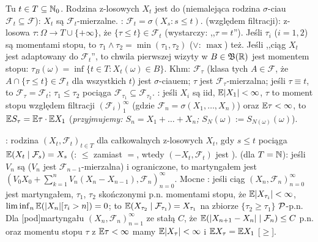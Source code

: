 Tu $t \in T \subseteq \mathbb N_0$.
Rodzina  z-losowych $X_t$ jest  do  (niemalejąca rodzina $\sigma$-ciau $\mathcal F_t \subseteq \mathcal F$): $X_t$ są $\mathcal F_t$-mierzalne.
: $\mathcal F_t = \sigma (X_s : s \le t)$.
 (względem filtracji): z-losowa $\tau \colon \Omega \to T \cup \{+\infty\}$, że $\{\tau \le t\} \in \mathcal F_t$ (wystarczy: ,,$\tau = t$'').
Jeśli $\tau_i$ ($i = 1,2$) są momentami stopu, to $\tau_1 \wedge \tau_2 = \min (\tau_1, \tau_2)$ ($\vee$: $\max$) też.
Jeśli ,,ciąg $X_t$ jest adaptowany do $\mathcal F_t$'', to chwila pierwszej wizyty w $B \in \mathfrak B(\mathbb{R})$ jest momentem stopu: $\tau_B (\omega) = \inf \{t \in T : X_t (\omega) \in B\}$.
Khm: $\mathcal F_\tau$ (klasa tych $A \in \mathcal F$, że $A \cap \{\tau \le t\} \in \mathcal F_t$ dla wszystkich $t$) jest $\sigma$-ciauem; $\tau$ jest $\mathcal F_\tau$-mierzalna; jeśli $\tau \equiv t$, to $\mathcal F_\tau = \mathcal F_t$; $\tau_1 \le \tau_2$ pociąga $\mathcal F_{\tau_1} \subseteq \mathcal F_{\tau_2}$.
: jeśli $X_i$ są iid, $\mathbb{E} |X_1| < \infty$, $\tau$ to moment stopu względem filtracji $(\mathcal F_i)_1^\infty$ (gdzie $\mathcal F_n = \sigma (X_1, \ldots, X_n)$) oraz $\mathbb{E} \tau < \infty$, to $\mathbb{E} S_\tau = \mathbb{E} \tau \cdot \mathbb{E} X_1$ (\emph{przyjmujemy: $S_n = X_1 + \ldots + X_n$; $S_N(\omega) := S_{N(\omega)}(\omega)$}).

:  rodzina $(X_t, \mathcal F_t)_{t \in T}$ dla całkowalnych z-losowych $X_t$, gdy $s \le t$ pociąga $\mathbb{E} (X_t \mid \mathcal F_s) = X_s$ (: $\le$ zamiast $=$, wtedy $(-X_t, \mathcal F_t)$ jest ).
 (dla $T = \mathbb N$): jeśli $V_n$ są  ($V_n$ jest $\mathcal F_{n-1}$-mierzalna) i ograniczone, to martyngałem jest $(V_0X_0  + \sum_{k=1}^n V_n (X_n - X_{n-1}), \mathcal F_n)_{n=0}^\infty$. 
Mocne : jeśli ciąg $(X_n, \mathcal F_n)_{n=0}^\infty$ jest martyngałem, $\tau_1$, $\tau_2$ skończonymi p.n. momentami stopu, że $\mathbb{E} |X_{\tau_i}| < \infty$, $\liminf_{n} \mathbb{E} (|X_n| [\tau_i > n]) = 0$; to $\mathbb{E} (X_{\tau_2} \mid \mathcal F _{\tau_1}) = X_{\tau_1}$ na zbiorze $\{\tau_2 \ge \tau_1\}$ $\operatorname{\mathcal{P}}$-p.n.
Dla [pod]martyngału $(X_n, \mathcal F_n)_{n=1}^\infty$ ze stałą $C$, że $\mathbb{E} (|X_{n+1} - X_n| \mid \mathcal F_n) \le C$ p.n. oraz momentu stopu $\tau$ z $\mathbb{E} \tau < \infty$ mamy $\mathbb{E} |X_\tau| < \infty$ i $\mathbb{E} X_\tau = \mathbb{E} X_1$ [$\ge$].

